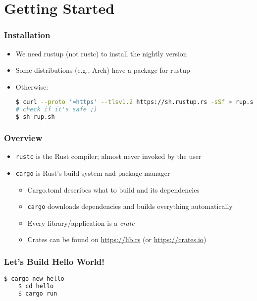 \section{Getting Started}

\begin{frame}[fragile]
    \frametitle{Installation}

    \begin{itemize}
        \item We need rustup (not rustc) to install the nightly version
        \item Some distributions (e.g., Arch) have a package for rustup
        \item Otherwise:
\begin{lstlisting}[language=bash]
$ curl --proto '=https' --tlsv1.2 https://sh.rustup.rs -sSf > rup.sh
# check if it's safe ;)
$ sh rup.sh
\end{lstlisting}
    \end{itemize}
\end{frame}

\begin{frame}
    \frametitle{Overview}

    \begin{itemize}
        \item \texttt{rustc} is the Rust compiler; almost never invoked by the user
        \item \texttt{cargo} is Rust's build system and package manager
        \begin{itemize}
            \item Cargo.toml describes what to build and its dependencies
            \item \texttt{cargo} downloads dependencies and builds everything automatically
            \item Every library/application is a \emph{crate}
            \item Crates can be found on \url{https://lib.rs} (or \url{https://crates.io})
        \end{itemize}
    \end{itemize}
\end{frame}

\begin{frame}[fragile]
    \frametitle{Let's Build Hello World!}

    \begin{lstlisting}[language=bash]
    $ cargo new hello
    $ cd hello
    $ cargo run
    \end{lstlisting}
\end{frame}
